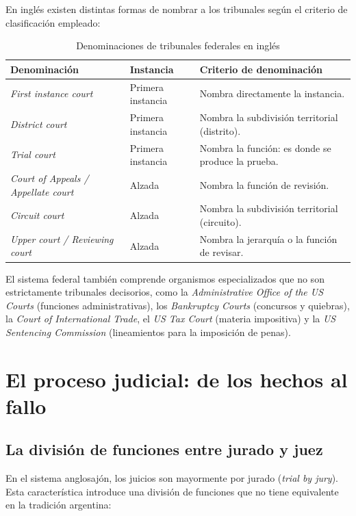 \documentclass[12pt,oneside]{book}
\begin{document}
En inglés existen distintas formas de nombrar a los tribunales según el criterio de clasificación empleado:

\begin{table}[H]
\centering
\caption{Denominaciones de tribunales federales en inglés}
\begin{tabularx}{\textwidth}{>{\raggedright\arraybackslash}p{} >{\raggedright\arraybackslash}p{} >{\raggedright\arraybackslash}X}
\toprule
\textbf{Denominación} & \textbf{Instancia} & \textbf{Criterio de denominación} \\
\midrule
\textit{First instance court} & Primera instancia & Nombra directamente la instancia. \\
\textit{District court} & Primera instancia & Nombra la subdivisión territorial (distrito). \\
\textit{Trial court} & Primera instancia & Nombra la función: es donde se produce la prueba. \\
\textit{Court of Appeals / Appellate court} & Alzada & Nombra la función de revisión. \\
\textit{Circuit court} & Alzada & Nombra la subdivisión territorial (circuito). \\
\textit{Upper court / Reviewing court} & Alzada & Nombra la jerarquía o la función de revisar. \\
\bottomrule
\end{tabularx}
\end{table}

El sistema federal también comprende organismos especializados que no son estrictamente tribunales decisorios, como la \textit{Administrative Office of the US Courts} (funciones administrativas), los \textit{Bankruptcy Courts} (concursos y quiebras), la \textit{Court of International Trade}, el \textit{US Tax Court} (materia impositiva) y la \textit{US Sentencing Commission} (lineamientos para la imposición de penas).

\section{El proceso judicial: de los hechos al fallo}

\subsection{La división de funciones entre jurado y juez}

En el sistema anglosajón, los juicios son mayormente por jurado (\textit{trial by jury}). Esta característica introduce una división de funciones que no tiene equivalente en la tradición argentina:
\end{document}
